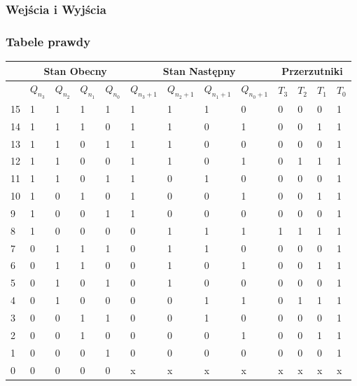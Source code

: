 \documentclass[a4paper]{article}
\begin{document}
\subsubsection{Wejścia i Wyjścia}
\subsubsection{Tabele prawdy}
\begin{center}
    \begin{tabular}{|l|l|l|l|l||l|l|l|l||l|l|l|l|}
    \hline
    &\multicolumn{4}{c||}{Stan Obecny} & \multicolumn{4}{|c||}{Stan Następny} & \multicolumn{4}{|c|}{Przerzutniki} \\\hline
       &$Q_{n_3}$ & $Q_{n_2}$ & $Q_{n_1}$ & $Q_{n_0}$ & $Q_{n_3+1}$ & $Q_{n_2+1}$ & $Q_{n_1+1}$ &$Q_{n_0+1}$ & $T_3$ & $T_2$ & $T_1$ & $T_0$ \\ \hline
    15 & 1 & 1 & 1 & 1 & 1 & 1 & 1 & 0 & 0 & 0 & 0 & 1 \\ \hline
    14 & 1 & 1 & 1 & 0 & 1 & 1 & 0 & 1 & 0 & 0 & 1 & 1 \\ \hline
    13 & 1 & 1 & 0 & 1 & 1 & 1 & 0 & 0 & 0 & 0 & 0 & 1 \\ \hline
    12 & 1 & 1 & 0 & 0 & 1 & 1 & 0 & 1 & 0 & 1 & 1 & 1 \\ \hline
    11 & 1 & 1 & 0 & 1 & 1 & 0 & 1 & 0 & 0 & 0 & 0 & 1 \\ \hline
    10 & 1 & 0 & 1 & 0 & 1 & 0 & 0 & 1 & 0 & 0 & 1 & 1 \\ \hline
    9  & 1 & 0 & 0 & 1 & 1 & 0 & 0 & 0 & 0 & 0 & 0 & 1 \\ \hline
    8  & 1 & 0 & 0 & 0 & 0 & 1 & 1 & 1 & 1 & 1 & 1 & 1 \\ \hline
    7  & 0 & 1 & 1 & 1 & 0 & 1 & 1 & 0 & 0 & 0 & 0 & 1 \\ \hline
    6  & 0 & 1 & 1 & 0 & 0 & 1 & 0 & 1 & 0 & 0 & 1 & 1 \\ \hline
    5  & 0 & 1 & 0 & 1 & 0 & 1 & 0 & 0 & 0 & 0 & 0 & 1 \\ \hline
    4  & 0 & 1 & 0 & 0 & 0 & 0 & 1 & 1 & 0 & 1 & 1 & 1 \\ \hline
    3  & 0 & 0 & 1 & 1 & 0 & 0 & 1 & 0 & 0 & 0 & 0 & 1 \\ \hline
    2  & 0 & 0 & 1 & 0 & 0 & 0 & 0 & 1 & 0 & 0 & 1 & 1 \\ \hline
    1  & 0 & 0 & 0 & 1 & 0 & 0 & 0 & 0 & 0 & 0 & 0 & 1 \\ \hline
    0  & 0 & 0 & 0 & 0 & x & x & x & x & x & x & x & x \\ \hline
    \end{tabular}
    \end{center}
\end{document}
